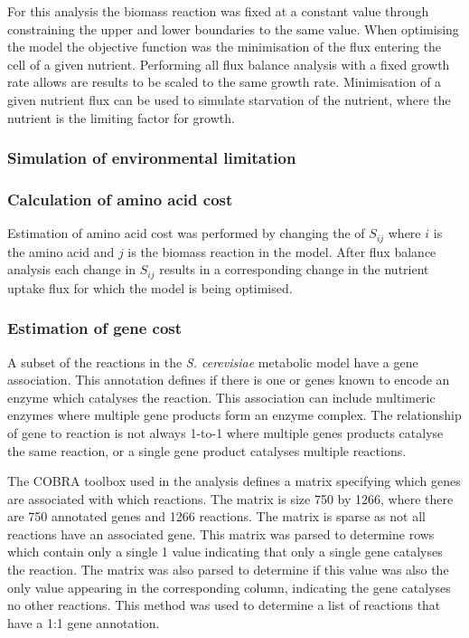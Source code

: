 For this analysis the biomass reaction was fixed at a constant value through constraining the upper and lower boundaries to the same value. When optimising the model the objective function was the minimisation of the flux entering the cell of a given nutrient. Performing all flux balance analysis with a fixed growth rate allows are results to be scaled to the same growth rate. Minimisation of a given nutrient flux can be used to simulate starvation of the nutrient, where the nutrient is the limiting factor for growth.

\subsubsection{Simulation of environmental limitation}

\subsubsection{Calculation of amino acid cost}

Estimation of amino acid cost was performed by changing the of $S_{ij}$ where $i$ is the amino acid and $j$ is the biomass reaction in the model. After flux balance analysis each change in $S_{ij}$ results in a corresponding change in the nutrient uptake flux for which the model is being optimised.

\subsubsection{Estimation of gene cost}

A subset of the reactions in the \emph{S. cerevisiae} metabolic model have a gene association. This annotation defines if there is one or genes known to encode an enzyme which catalyses the reaction. This association can include multimeric enzymes where multiple gene products form an enzyme complex. The relationship of gene to reaction is not always 1-to-1 where multiple genes products catalyse the same reaction, or a single gene product catalyses multiple reactions. 

The COBRA toolbox used in the analysis defines a matrix specifying which genes are associated with which reactions. The matrix is size 750 by 1266, where there are 750 annotated genes and 1266 reactions. The matrix is sparse as not all reactions have an associated gene. This matrix was parsed to determine rows which contain only a single 1 value indicating that only a single gene catalyses the reaction. The matrix was also parsed to determine if this value was also the only value appearing in the corresponding column, indicating the gene catalyses no other reactions. This method was used to determine a list of reactions that have a 1:1 gene annotation.

